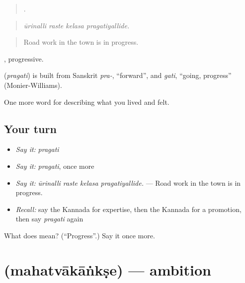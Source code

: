 \begin{quote}
   .
\end{quote}

\begin{quote}
\emph{ūrinalli raste kelasa pragatiyallide.}
\end{quote}

\begin{quote}
Road work in the town is in progress.
\end{quote}

, progressive.

\begin{cousinweb}
\textbf{} (\emph{pragati}) is built from Sanskrit \emph{pra-}, \textquotedblleft{}forward\textquotedblright{}, and \emph{gati}, \textquotedblleft{}going, progress\textquotedblright{} (Monier-Williams).
\end{cousinweb}

\begin{grammarlens}[title={What you've built}]
One more word for describing what you lived and felt.
\end{grammarlens}

\subsection*{Your turn}
\begin{itemize}
\raggedright
  \item \emph{Say it:} \emph{pragati}
  \item \emph{Say it:} \emph{pragati}, once more
  \item \emph{Say it:} \emph{ūrinalli raste kelasa pragatiyallide.} — Road work in the town is in progress.
  \item \emph{Recall:} say the Kannada for expertise, then the Kannada for a promotion, then say \emph{pragati} again
\end{itemize}

\begin{tcolorbox}[breakable,colback=teal!4,colframe=teal!35!black,title={Before you move on}]
What does  mean? (\textquotedblleft{}Progress\textquotedblright{}.) Say it once more.
\end{tcolorbox}
\section[\texorpdfstring{\kn{ಮಹತ್ವಾಕಾಂಕ್ಷೆ} (mahatvākāṅkṣe)}{ಮಹತ್ವಾಕಾಂಕ್ಷೆ (mahatvākāṅkṣe)}]{ (mahatvākāṅkṣe) — ambition}

